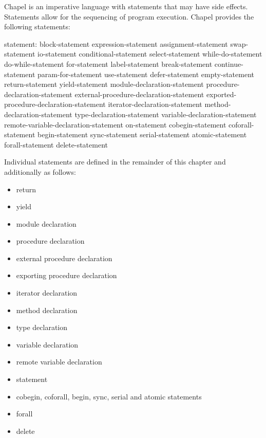 \label{Statements}

Chapel is an imperative language with statements that may have side
effects.  Statements allow for the sequencing of program execution.
Chapel provides the following statements:

\begin{syntax}
statement:
  block-statement
  expression-statement
  assignment-statement
  swap-statement
  io-statement
  conditional-statement
  select-statement
  while-do-statement
  do-while-statement
  for-statement
  label-statement
  break-statement
  continue-statement
  param-for-statement
  use-statement
  defer-statement
  empty-statement
  return-statement
  yield-statement
  module-declaration-statement
  procedure-declaration-statement
  external-procedure-declaration-statement
  exported-procedure-declaration-statement
  iterator-declaration-statement
  method-declaration-statement
  type-declaration-statement
  variable-declaration-statement
  remote-variable-declaration-statement
  on-statement
  cobegin-statement
  coforall-statement
  begin-statement
  sync-statement
  serial-statement
  atomic-statement
  forall-statement
  delete-statement
\end{syntax}

Individual statements are defined in the remainder of this chapter
and additionally as follows:

\begin{itemize}
\item return 
\item yield 
\item module declaration 
\item procedure declaration 
\item external procedure declaration 
\item exporting procedure declaration 
\item iterator declaration 
\item method declaration 
\item type declaration 
\item variable declaration 
\item remote variable declaration ~
\item {} statement 
\item cobegin, coforall, begin, sync, serial and atomic statements
\item forall 
\item delete 
\end{itemize}

